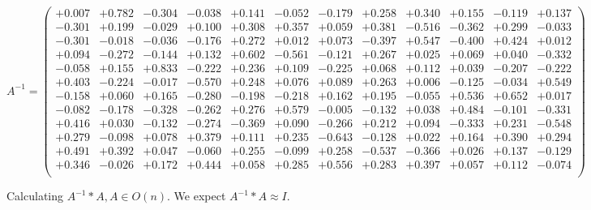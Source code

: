\documentclass[9pt]{article}
\theoremstyle{plain}
\theoremstyle{definition}
\theoremstyle{remark}
\numberwithin{equation}{section}
\begin{document}
$A^{-1} = \left(
\begin{array}{
cccccccccccc}
+0.007 & +0.782 & -0.304 & -0.038 & +0.141 & -0.052 & -0.179 & +0.258 & +0.340 & +0.155 & -0.119 & +0.137 \\
-0.301 & +0.199 & -0.029 & +0.100 & +0.308 & +0.357 & +0.059 & +0.381 & -0.516 & -0.362 & +0.299 & -0.033 \\
-0.301 & -0.018 & -0.036 & -0.176 & +0.272 & +0.012 & +0.073 & -0.397 & +0.547 & -0.400 & +0.424 & +0.012 \\
+0.094 & -0.272 & -0.144 & +0.132 & +0.602 & -0.561 & -0.121 & +0.267 & +0.025 & +0.069 & +0.040 & -0.332 \\
-0.058 & +0.155 & +0.833 & -0.222 & +0.236 & +0.109 & -0.225 & +0.068 & +0.112 & +0.039 & -0.207 & -0.222 \\
+0.403 & -0.224 & -0.017 & -0.570 & +0.248 & +0.076 & +0.089 & +0.263 & +0.006 & -0.125 & -0.034 & +0.549 \\
-0.158 & +0.060 & +0.165 & -0.280 & -0.198 & -0.218 & +0.162 & +0.195 & -0.055 & +0.536 & +0.652 & +0.017 \\
-0.082 & -0.178 & -0.328 & -0.262 & +0.276 & +0.579 & -0.005 & -0.132 & +0.038 & +0.484 & -0.101 & -0.331 \\
+0.416 & +0.030 & -0.132 & -0.274 & -0.369 & +0.090 & -0.266 & +0.212 & +0.094 & -0.333 & +0.231 & -0.548 \\
+0.279 & -0.098 & +0.078 & +0.379 & +0.111 & +0.235 & -0.643 & -0.128 & +0.022 & +0.164 & +0.390 & +0.294 \\
+0.491 & +0.392 & +0.047 & -0.060 & +0.255 & -0.099 & +0.258 & -0.537 & -0.366 & +0.026 & +0.137 & -0.129 \\
+0.346 & -0.026 & +0.172 & +0.444 & +0.058 & +0.285 & +0.556 & +0.283 & +0.397 & +0.057 & +0.112 & -0.074 \\
\end{array}
\right)$ \newline 

Calculating $A^{-1} *A  ,  A \in O(n)$.   We expect $A^{-1} *A  \approx I$. 
\end{document}
